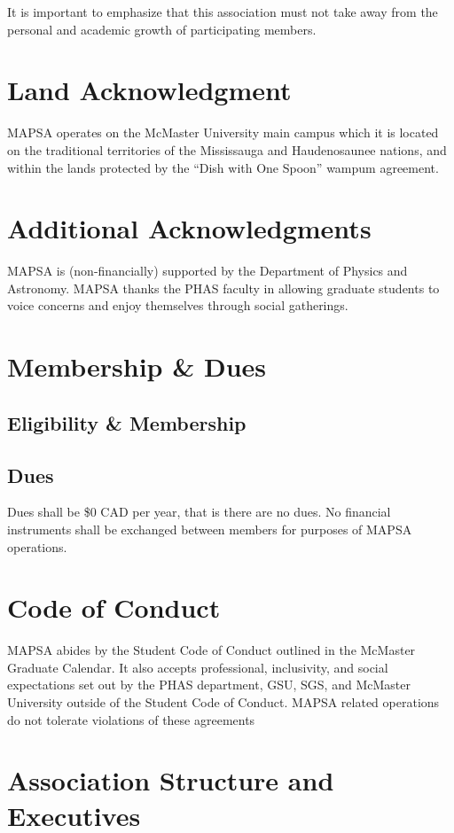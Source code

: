 \documentclass[onecolumn,aps,prd]{revtex4-2}
\begin{document}
It is important to emphasize that this association must not take away from the personal and academic growth of participating members.

\section{Land Acknowledgment}
MAPSA operates on the McMaster University main campus which it is located on the traditional territories of the Mississauga and Haudenosaunee nations, and within the lands protected by the ``Dish with One Spoon'' wampum agreement.

\section{Additional Acknowledgments}
MAPSA is (non-financially) supported by the Department of Physics and Astronomy. MAPSA thanks the PHAS faculty in allowing graduate students to voice concerns and enjoy themselves through social gatherings.

\section{Membership \& Dues}
\subsection{Eligibility \& Membership}
\subsection{Dues}
Dues shall be \$0 CAD per year, that is there are no dues. No financial instruments shall be exchanged between members for purposes of MAPSA operations.

\section{Code of Conduct}
MAPSA abides by the Student Code of Conduct outlined in the McMaster Graduate Calendar. It also accepts professional, inclusivity, and social expectations set out by the PHAS department, GSU, SGS, and McMaster University outside of the Student Code of Conduct. MAPSA related operations do not tolerate violations of these agreements

\section{Association Structure and Executives}
\end{document}
